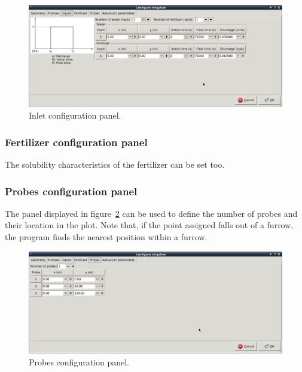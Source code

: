 \documentclass[review,authoryear]{elsarticle}
\begin{document}
\begin{figure}[!ht]
\begin{center}
\includegraphics[width=1125\UNIT]{confInputEN.eps}
\caption{Inlet configuration panel.}\label{input}
\end{center}
\end{figure}

\subsubsection{Fertilizer configuration panel}

The solubility characteristics of the fertilizer can be set too. 

\subsubsection{Probes configuration panel}

The panel displayed in figure~\ref{sondas} can be used to define the number of
probes and their location in the plot. Note that, if the point assigned falls
out of a furrow, the program finds the nearest position within a furrow.

\begin{figure}[!ht]
\begin{center}
\includegraphics[width=1125\UNIT]{confSondasEN.eps}
\caption{Probes configuration panel.}\label{sondas}
\end{center}
\end{figure}
\end{document}
